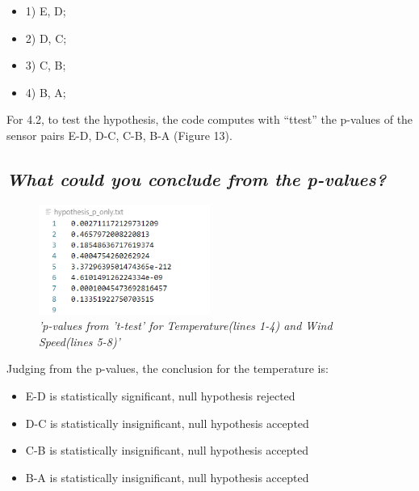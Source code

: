 \documentclass[a4paper,12pt]{article}
\begin{document}
\begin{itemize}
\item {1) E, D;}
\item {2) D, C;}
\item {3) C, B;}
\item {4) B, A;}
\end{itemize}




For 4.2, to test the hypothesis, the code computes with “ttest” the p-values of
the sensor pairs E-D, D-C, C-B, B-A (Figure 13). 




\subsection{\it What could you conclude from the p-values?}



\begin{figure}[H]
\centering
\includegraphics[width=0.5\textwidth]{Graphs/Pvalues_95pr_ttest_TEMP_WS.PNG}
\caption{\it'p-values from 't-test' for Temperature(lines 1-4) and Wind Speed(lines 5-8)'}
\end{figure}




Judging from the p-values, the conclusion for the temperature is:

\begin{itemize}

\item{E-D is statistically significant, null hypothesis rejected}


\item{D-C is statistically insignificant, null hypothesis accepted}


\item{C-B is statistically insignificant, null hypothesis accepted}


\item{B-A is statistically insignificant, null hypothesis accepted}

\end{itemize}
\end{document}
